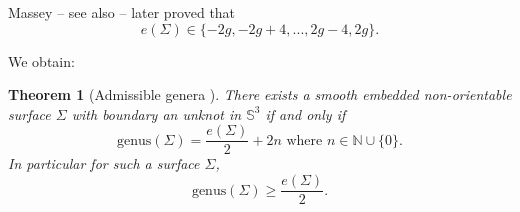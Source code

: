 \documentclass[11pt, reqno]{amsart}
\newtheorem{thm}{Theorem}[section]
\numberwithin{equation}{section}
\begin{document}
Massey \cite{Ma} -- see also \cite[Corollary 1.1.1]{Yasuhara} -- later proved that 
\begin{equation}\label{options}
e(\Sigma)\in \{-2g,-2g+4,..., 2g-4, 2g\}.
\end{equation}

We obtain: 
\begin{thm}[Admissible genera \cite{Whitney,Ma}]\label{admissible}
There exists a smooth embedded non-orientable surface $\Sigma$ with boundary an unknot in $\mathbb{S}^3$ if and only if
\begin{equation}\label{adgen}
\mbox{genus}(\Sigma)=\frac{e(\Sigma)}{2}+2n\mbox{ where } n\in\mathbb{N}\cup\{0\}.
\end{equation}
In particular for such a surface $\Sigma$,
\begin{equation}
\mbox{genus}(\Sigma)\geq\frac{e(\Sigma)}{2}.
\end{equation}
\end{thm}
\end{document}
